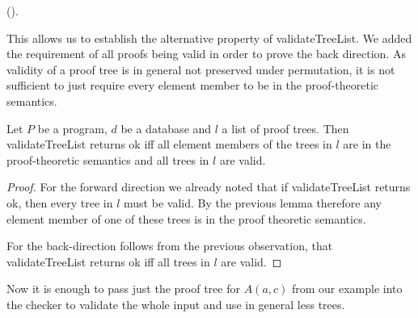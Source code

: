 (\allTreeElementsOfValidTreeInSemantics).

This allows us to establish the alternative property of validateTreeList. We added the requirement of all proofs being valid in order to prove the back direction. As validity of a proof tree is in general not preserved under permutation, it is not sufficient to just require every element member to be in the proof-theoretic semantics.

\begin{lemma}[\validateTreeListUnitIffSubsetSemanticsAndAllElementsHaveValidTrees]
    Let $P$ be a program, $d$ be a database and $l$ a list of proof trees. Then validateTreeList returns ok iff all element members of the trees in $l$ are in the proof-theoretic semantics and all trees in $l$ are valid.
\end{lemma}
\begin{proof}
    For the forward direction we already noted that if validateTreeList returns ok, then every tree in $l$ must be valid. By the previous lemma therefore any element member of one of these  trees is in the proof theoretic semantics.

    For the back-direction follows from the previous observation, that validateTreeList returns ok iff all trees in $l$ are valid.
\end{proof}

Now it is enough to pass just the proof tree for $A(a,c)$ from our example into the checker to validate the whole input and use in general less trees. 
